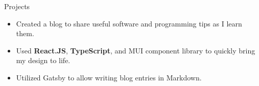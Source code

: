 \documentclass{resume} %
\begin{document}
\begin{workSection}{Projects}
	
	\customItem[
		title=AshBlog (in progress),
		duration=August 2024 - present,
	]
	\begin{itemize}
		\vspace{-0.5em}
		\itemsep -6pt {}
		\item Created a blog to share useful software and programming tips as I learn them.
		\item Used \textbf{React.JS}, \textbf{TypeScript}, and MUI component library to quickly bring my design to life.
		\item Utilized Gatsby to allow writing blog entries in Markdown.
	\end{itemize}
	
	
	

\end{workSection}
\end{document}

